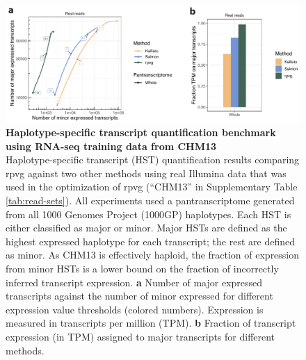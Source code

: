 \documentclass[11pt]{ucthesis}
\begin{document}
\begin{figure}[H]
\ssp
\begin{center}
\includegraphics[width=\textwidth]{mpmapfigures/figureS8.pdf}
\caption{\textbf{Haplotype-specific transcript quantification benchmark using RNA-seq training data from CHM13} \\
Haplotype-specific transcript (HST) quantification results comparing rpvg against two other methods using real Illumina data that was used in the optimization of rpvg (``CHM13'' in Supplementary Table \ref{tab:read-sets}). All experiments used a pantranscriptome generated from all 1000 Genomes Project (1000GP) haplotypes. Each HST is either classified as major or minor. Major HSTs are defined as the highest expressed haplotype for each transcript; the rest are defined as minor. As CHM13 is effectively haploid, the fraction of expression from minor HSTs is a lower bound on the fraction of incorrectly inferred transcript expression. \textbf{a} Number of major expressed transcripts against the number of minor expressed for different expression value thresholds (colored numbers). Expression is measured in transcripts per million (TPM). \textbf{b} Fraction of transcript expression (in TPM) assigned to major transcripts for different methods.
} \label{fig:expression-t2t}
\end{center}
\end{figure}
\end{document}
